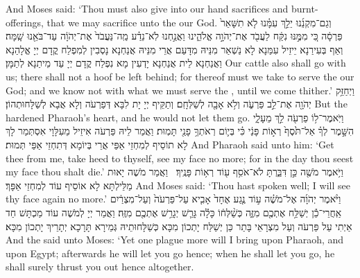 {And Moses said: ‘Thou must also give into our hand sacrifices and burnt-offerings, that we may sacrifice unto the \lord\space our God.}{}
{וְגַם־מִקְנֵ֜נוּ יֵלֵ֣ךְ עִמָּ֗נוּ לֹ֤א תִשָּׁאֵר֙ פַּרְסָ֔ה כִּ֚י מִמֶּ֣נּוּ נִקַּ֔ח לַעֲבֹ֖ד אֶת־יְהֹוָ֣ה אֱלֹהֵ֑ינוּ וַאֲנַ֣חְנוּ לֹֽא־נֵדַ֗ע מַֽה־נַּעֲבֹד֙ אֶת־יְהֹוָ֔ה עַד־בֹּאֵ֖נוּ שָֽׁמָּה׃
}
{וְאַף בְּעִירַנָא יֵיזֵיל עִמַּנָא לָא נַשְׁאַר מִנֵּיהּ מִדָּעַם אֲרֵי מִנֵּיהּ אֲנַחְנָא נָסְבִין לְמִפְלַח קֳדָם יְיָ אֱלָהַנָא וַאֲנַחְנָא לֵית אֲנַחְנָא יָדְעִין מָא נִפְלַח קֳדָם יְיָ עַד מֵיתַנָא לְתַמָּן׃}
{Our cattle also shall go with us; there shall not a hoof be left behind; for thereof must we take to serve the \lord\space our God; and we know not with what we must serve the \lord, until we come thither.’}{}
{וַיְחַזֵּ֥ק יְהֹוָ֖ה אֶת־לֵ֣ב פַּרְעֹ֑ה וְלֹ֥א אָבָ֖ה לְשַׁלְּחָֽם׃}
{וְתַקֵּיף יְיָ יָת לִבָּא דְּפַרְעֹה וְלָא אֲבָא לְשַׁלָּחוּתְהוֹן׃}
{But the \lord\space hardened Pharaoh’s heart, and he would not let them go.}{}
{וַיֹּֽאמֶר־ל֥וֹ פַרְעֹ֖ה לֵ֣ךְ מֵעָלָ֑י הִשָּׁ֣מֶר לְךָ֗ אַל־תֹּ֙סֶף֙ רְא֣וֹת פָּנַ֔י כִּ֗י בְּי֛וֹם רְאֹתְךָ֥ פָנַ֖י תָּמֽוּת׃}
{וַאֲמַר לֵיהּ פַּרְעֹה אִיזֵיל מֵעִלָּוָי אִסְתְּמַר לָךְ לָא תוֹסֵיף לְמִחְזֵי אַפַּי אֲרֵי בְּיוֹמָא דְּתִחְזֵי אַפַּי תְּמוּת׃}
{And Pharaoh said unto him: ‘Get thee from me, take heed to thyself, see my face no more; for in the day thou seest my face thou shalt die.’}{}
{וַיֹּ֥אמֶר מֹשֶׁ֖ה כֵּ֣ן דִּבַּ֑רְתָּ לֹא־אֹסִ֥ף ע֖וֹד רְא֥וֹת פָּנֶֽיךָ׃ \petucha 
{}}
{וַאֲמַר מֹשֶׁה יָאוּת מַלֵּילְתָּא לָא אוֹסֵיף עוֹד לְמִחְזֵי אַפָּךְ׃}
{And Moses said: ‘Thou hast spoken well; I will see thy face again no more.’}{}
\newperek
{}%
{וַיֹּ֨אמֶר יְהֹוָ֜ה אֶל־מֹשֶׁ֗ה ע֣וֹד נֶ֤גַע אֶחָד֙ אָבִ֤יא עַל־פַּרְעֹה֙ וְעַל־מִצְרַ֔יִם אַֽחֲרֵי־כֵ֕ן יְשַׁלַּ֥ח אֶתְכֶ֖ם מִזֶּ֑ה כְּשַׁ֨לְּח֔וֹ כָּלָ֕ה גָּרֵ֛שׁ יְגָרֵ֥שׁ אֶתְכֶ֖ם מִזֶּֽה׃
}
{וַאֲמַר יְיָ לְמֹשֶׁה עוֹד מַכְתָּשׁ חַד אַיְתִי עַל פַּרְעֹה וְעַל מִצְרָאֵי בָּתַר כֵּן יְשַׁלַּח יָתְכוֹן מִכָּא כְּשַׁלָּחוּתֵיהּ גְּמֵירָא תָּרָכָא יְתָרֵיךְ יָתְכוֹן מִכָּא׃}
{And the \lord\space said unto Moses: ‘Yet one plague more will I bring upon Pharaoh, and upon Egypt; afterwards he will let you go hence; when he shall let you go, he shall surely thrust you out hence altogether.}{}
